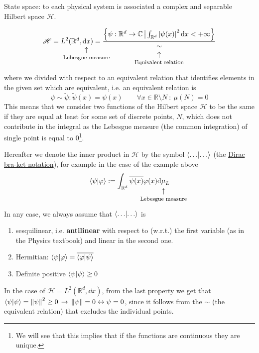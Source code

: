 \documentclass[../main.tex]{subfiles}
\begin{document}
State space: to each physical system is associated a complex and separable Hilbert space $\mathcal{H}$.
\begin{example}
\[
\mathcal{H}=L^2(\mathbb{R}^d,\underset{\mathclap{\tikz \node {$\uparrow$} node [below=1ex] {\footnotesize Lebesgue measure};}}{\dd{x}})=\frac{\left\{\psi:\mathbb{R}^d\to\mathbb{C}\,\big|\int_{\mathbb{R}^d}\abs{\psi(x)}^2\dd{x}<+\infty\right\}}{\underset{\mathclap{\tikz \node {$\uparrow$} node [below=1ex] {\footnotesize Equivalent relation};}}{\sim}}
\]
where we divided with respect to an equivalent relation that identifies elements in the given set which are equivalent, i.e. an equivalent relation is
\[
     \psi\sim\tilde{\psi}:\tilde{\psi}(x)=\psi(x)\qquad \forall x\in \mathbb{R}\setminus N ~:~\mu(N)=0
\]
This means that we consider two functions of the Hilbert space $\mathcal{H}$ to be the same if they are equal at least for some set of discrete points, $N$, which does not contribute in the integral as the Lebesgue measure (the common integration) of single point is equal to $0$\footnote{We will see that this implies that if the functions are continuous they are unique.}.
\end{example}
\begin{kaobox}[frametitle=Notation]
Hereafter we denote the inner product in $\mathcal{H}$ by the symbol $\braket{\dots}$ (the \href{https://it.wikipedia.org/wiki/Notazione_bra-ket}{Dirac bra-ket notation}), for example in the case of the example above
\[
\braket{\psi}{\varphi}:=\int_{\mathbb{R}^d}\overline{\psi(x)}\varphi(x)\underset{\mathclap{\tikz \node {$\uparrow$} node [below=1ex] {\footnotesize Lebesgue measure};}}{\dd{\mu}_L}
\]
In any case, we always assume that $\braket{\dots}$ is
\begin{enumerate}
    \item sesquilinear, i.e. \textbf{antilinear} with respect to (w.r.t.) the first variable (as in the Physics textbook) and linear in the second one.
\item Hermitian: $\braket{\psi}{\varphi}=\overline{\braket{\varphi}{\psi}}$
\item Definite positive $\braket{\psi}\geq 0$
\end{enumerate} 
\end{kaobox}
In the case of $\mathcal{H}=L^2(\mathbb{R}^d,\dd{x})$, from the last property we get that $\braket{\psi}=\norm{\psi}^2\geq 0 \,\to\, \norm{\psi}=0\leftrightarrow \psi = 0$, since it follows from the $\sim$ (the equivalent relation) that excludes the individual points.
\end{document}
